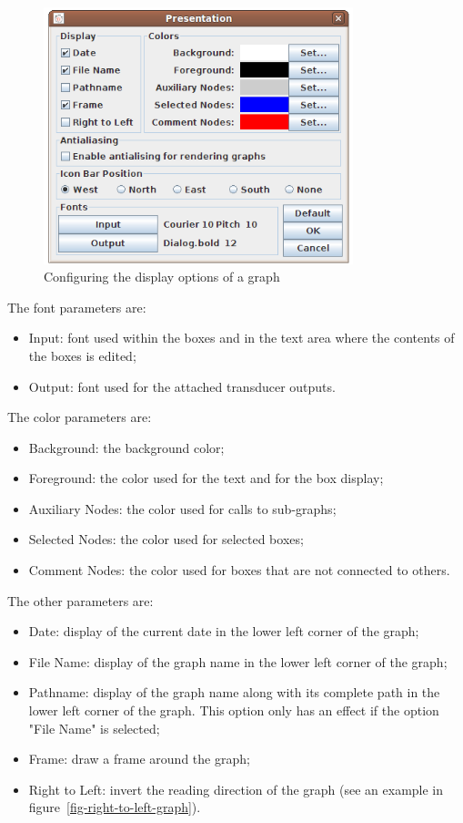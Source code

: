 \begin{figure}[!h]
\begin{center}
\includegraphics[width=9cm]{resources/img/fig5-26.png}
\caption{Configuring the display options of a graph\label{fig-graph-display-configuration}}
\end{center}
\end{figure}

\bigskip
\noindent The font parameters are:
\begin{itemize}
  \item Input: font used within the boxes and in the text area where the
  contents of the boxes is edited;
  
  \item Output: font used for the attached transducer outputs.
\end{itemize}

\bigskip
\noindent The color parameters are:
\begin{itemize}
  \item Background: the background color;
  \item Foreground: the color used for the text and for the box display;
  \item Auxiliary Nodes: the color used for calls to sub-graphs;
  \item Selected Nodes: the color used for selected boxes;
  \item Comment Nodes: the color used for boxes that are not connected to others.
\end{itemize}

\bigskip
\noindent The other parameters are:
\begin{itemize}
  \item Date: display of the current date in the lower left corner of the graph;
  \item File Name: display of the graph name in the lower left corner of the graph;
  \item Pathname: display of the graph name along with its complete path in the
  lower left corner of the graph. This option only has an effect if the option
  "File Name" is selected;
  \item Frame: draw a frame around the graph;
  \item Right to Left: invert the reading direction of the graph (see an example
  in figure~\ref{fig-right-to-left-graph}).
\end{itemize}

